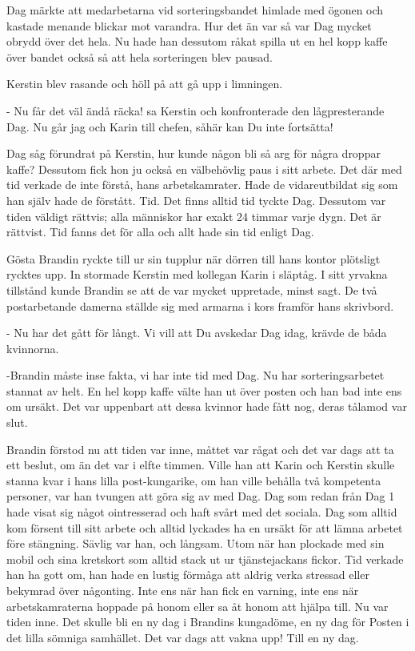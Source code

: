 Dag märkte att medarbetarna vid sorteringsbandet himlade med ögonen och kastade menande blickar mot varandra. Hur det än var så var Dag mycket obrydd över det hela. Nu hade han dessutom råkat spilla ut en hel kopp kaffe över bandet också så att hela sorteringen blev pausad. 

Kerstin blev rasande och höll på att gå upp i limningen.

- Nu får det väl ändå räcka! sa Kerstin och konfronterade den lågpresterande Dag. Nu går jag och Karin till chefen, såhär kan Du inte fortsätta! 

Dag såg förundrat på Kerstin, hur kunde någon bli så arg för några droppar kaffe? Dessutom fick hon ju också en välbehövlig paus i sitt arbete. Det där med tid verkade de inte förstå, hans arbetskamrater. Hade de vidareutbildat sig som han själv hade de förstått. Tid. Det finns alltid tid tyckte Dag. Dessutom var tiden väldigt rättvis; alla människor har exakt 24 timmar varje dygn. Det är rättvist. Tid fanns det för alla och allt hade sin tid enligt Dag.

Gösta Brandin ryckte till ur sin tupplur när dörren till hans kontor plötsligt rycktes upp. In stormade Kerstin med kollegan Karin i släptåg. I sitt yrvakna tillstånd kunde Brandin se att de var mycket uppretade, minst sagt. De två postarbetande damerna ställde sig med armarna i kors framför hans skrivbord. 

- Nu har det gått för långt. Vi vill att Du avskedar Dag idag, krävde de båda kvinnorna.

-Brandin måste inse fakta, vi har inte tid med Dag. Nu har sorteringsarbetet stannat av helt. En hel kopp kaffe välte han ut över posten och han bad inte ens om ursäkt. Det var uppenbart att dessa kvinnor hade fått nog, deras tålamod var slut.

Brandin förstod nu att tiden var inne, måttet var rågat och det var dags att ta ett beslut, om än det var i elfte timmen. Ville han att Karin och Kerstin skulle stanna kvar i hans lilla post-kungarike, om han ville behålla två kompetenta personer, var han tvungen att göra sig av med Dag. Dag som redan från Dag 1 hade visat sig något ointresserad och haft svårt med det sociala. Dag som alltid kom försent till sitt arbete och alltid lyckades ha en ursäkt för att lämna arbetet före stängning. Sävlig var han, och långsam. Utom när han plockade med sin mobil och sina kretskort som alltid stack ut ur tjänstejackans fickor. Tid verkade han ha gott om, han hade en lustig förmåga att aldrig verka stressad eller bekymrad över någonting. Inte ens när han fick en varning, inte ens när arbetskamraterna hoppade på honom eller sa åt honom att hjälpa till. Nu var tiden inne. Det skulle bli en ny dag i Brandins kungadöme, en ny dag för Posten i det lilla sömniga samhället. Det var dags att vakna upp! Till en ny dag.

